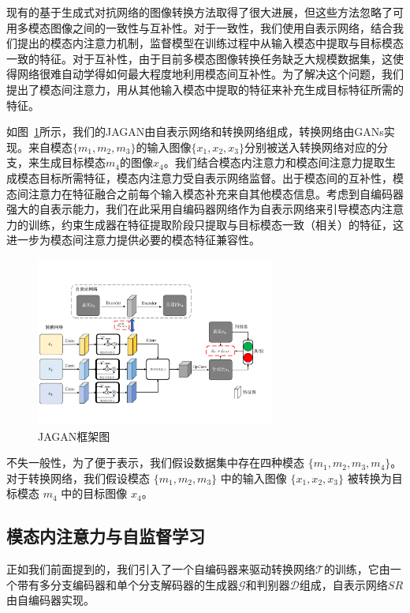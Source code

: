 现有的基于生成式对抗网络的图像转换方法取得了很大进展，但这些方法忽略了可用多模态图像之间的一致性与互补性。对于一致性，我们使用自表示网络，结合我们提出的模态内注意力机制，监督模型在训练过程中从输入模态中提取与目标模态一致的特征。对于互补性，由于目前多模态图像转换任务缺乏大规模数据集，这使得网络很难自动学得如何最大程度地利用模态间互补性。为了解决这个问题，我们提出了模态间注意力，用从其他输入模态中提取的特征来补充生成目标特征所需的特征。

如图~\ref{f1}所示，我们的JAGAN由自表示网络和转换网络组成，转换网络由GANs实现。来自模态$\{m_1, m_2, m_3\}$的输入图像$\{x_1, x_2, x_3\}$分别被送入转换网络对应的分支，来生成目标模态$m_4$的图像$x_4$。我们结合模态内注意力和模态间注意力提取生成模态目标所需特征，模态内注意力受自表示网络监督。出于模态间的互补性，模态间注意力在特征融合之前每个输入模态补充来自其他模态信息。考虑到自编码器强大的自表示能力，我们在此采用自编码器网络作为自表示网络来引导模态内注意力的训练，约束生成器在特征提取阶段只提取与目标模态一致（相关）的特征，这进一步为模态间注意力提供必要的模态特征兼容性。

\begin{figure}
    \centering
    \includegraphics[width=0.7\textwidth]{figures/JAGAN/framework.pdf}
    \caption[aaa]{JAGAN框架图}
    \label{f1}
\end{figure}

不失一般性，为了便于表示，我们假设数据集中存在四种模态 $\{m_1, m_2, m_3, m_4\}$。对于转换网络，我们假设模态 $\{m_1, m_2, m_3\}$ 中的输入图像 $\{x_1, x_2, x_3\}$ 被转换为目标模态 $m_4$ 中的目标图像 $x_4$。

\subsection{模态内注意力与自监督学习}

正如我们前面提到的，我们引入了一个自编码器来驱动转换网络$\mathcal{T}$的训练，它由一个带有多分支编码器和单个分支解码器的生成器$\mathcal{G}$和判别器$\mathcal{D}$组成，自表示网络$SR$由自编码器实现。

